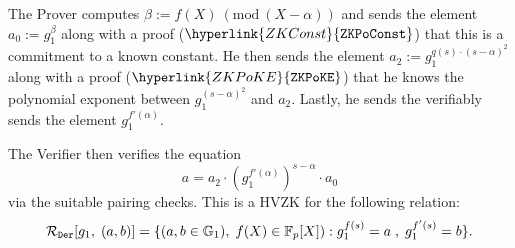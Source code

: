 \documentclass[11pt, lettersize, notitlepage, leqno, footskip=0.6cm]{article}
\newcommand{\bFp}{\mathbb{F}_p}
\newcommand{\lra}{\longrightarrow}
\newcommand{\mc}{\mathcal}
\newcommand{\mb}{\mathbb}
\newcommand{\al}{\alpha}
\newcommand{\be}{\beta}
\newcommand{\mP}{\mc{P}}
\newcommand{\V}{\mc{V}}
\newcommand{\vs}{\vspace{-0.15cm}}
\newcommand{\noin}{\noindent}
\newcommand{\Mod}[1]{\ (\mathrm{mod}\ #1)}
\newtheorem{Prot}[Thm]{Protocol}
\numberwithin{equation}{section}
\begin{document}
The Prover computes $\be:= f(X)\Mod{(X-\al)}$ and sends the element $a_0:= g_1^{\be}$ along with a proof ($\hyperlink{ZKConst}{\tt{ZKPoConst}}$) that this is a commitment to a known constant. He then sends the element $a_2:= g_1^{q(s)\cdot (s-\al)^2}$ along with a proof ($\hyperlink{ZKPoKE}{\tt{ZKPoKE}}$) that he knows the polynomial exponent between $g_1^{(s-\al)^2}$ and $a_2$. Lastly, he sends the verifiably sends the element $g_1^{f'(\al)}$. 

The Verifier then verifies the equation \vs $$ a = a_2 \cdot (g_1^{f'(\al)})^{s-\al}\cdot a_0  $$ via the suitable pairing checks. This is a HVZK for the following relation: $$\mc{R}_{\tt{Der}}[g_1,\;(a,b)] = \{(a,b\in\mb{G}_1),\; f(X)\in \bFp[X]): g_1^{f(s)} = a\;,\; g_1^{f'(s)} = b \}.  $$


\begin{comment}


\bigskip




\begin{mdframed}
\begin{Prot} \hypertarget{ZKDer}{Zero-knowledge proof of the  derivative of a polynomial} $(\hypertarget{ZKDer}{\tt{ZKPoDer}})$\end{Prot}  

\noin \textbf{Parameters:} A pairing ${\bf{e}}:\mb{G}_1\times \mb{G}_2\lra \mb{G}_T$; generators $g_1,\;g_2$ for $\mb{G}_1,\; \mb{G}_2$ respectively.


\noindent \textbf{Inputs:} Elements $a,b\in \mb{G}_1$

\noindent \textbf{Claim:} The Prover knows a polynomial $f(X)\in \bFp[X]$ such that $g_1^{f(s)} = a$ and $g_1^{f'(s)} = b$. 

\begin{enumerate}[wide, labelwidth=!, labelindent=0pt, itemsep=-0.2ex]

\item The Prover $\mP$ selects a random $c \in \bFp $ and sends $C:= g_1^c$ to the Verifier $\V$. 


\item The Fiat-Shamir heuristic generates a challenge $\al$.

\item The Prover $\mP$ computes a polynomial $q(X)$ and an element $\be \in \bFp$ such that \vs $$ f(X) =  q(X)(X-\al)^2 + f'(\al)\cdot (X-\al) + \be \vs $$ and sends $Q:= g_1^{q(s)} \in \mb{G}_1$, $C_{\be+c}:= g_1^{\be+c} \in \bFp$ to the Verifier $\V$ along with non-interactive proofs for $\hyperlink{ZKPoKE*}{\tt{ZKPoKE}^*}[g_1,\;Q]$ and $\hyperlink{Const}{\tt{ZKPoConst}}[g_1,\; C_{\be+c}]$.


\end{comment}
\end{document}
